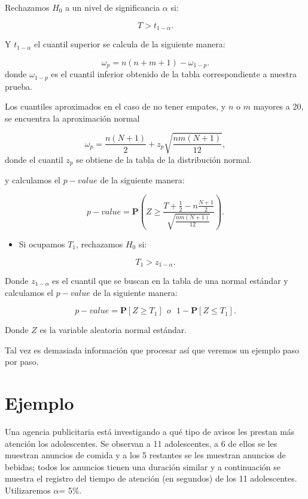 \documentclass[
  a4paper,
  oneside,
  openany]{book}
\providecommand{\tightlist}{%
  \setlength{\itemsep}{0pt}\setlength{\parskip}{0pt}}
\begin{document}
Rechazamos \(H_0\) a un nivel de significancia \(\alpha\) si:

\[T > t_{1-{\alpha}}.\]

Y \(t_{1-\alpha}\) el cuantil superior se calcula de la siguiente manera:

\[\omega_p= n(n+m+1)-\omega_{1-p}.\]
donde \(\omega_{1-p}\) es el cuantil inferior obtenido de la tabla correspondiente a nuestra prueba.

Los cuantiles aproximados en el caso de no tener empates, y \(n\) o \(m\) mayores a 20, se encuentra la aproximación normal

\[ \omega_p= \frac{n(N+1)}{2} + z_p\sqrt{\frac{n m(N+1)}{12}},\]
donde el cuantil \(z_p\) se obtiene de la tabla de la distribución normal.

y calculamos el \(p-value\) de la siguiente manera:

\[p-value = \mathbf{P}\left(Z\geq\frac{T+\frac{1}{2}-n\frac{N+1}{2}}{\sqrt{\frac{nm(N+1)}{12}}}\right).\]

\begin{itemize}
\tightlist
\item
  Si ocupamos \(T_{1}\), rechazamos \(H_0\) si:
\end{itemize}

\[T_{1} > z_{1-\alpha}.\]

Donde \(z_{1-\alpha}\) es el cuantil que se buscan en la tabla de una normal estándar y calculamos el \(p-value\) de la siguiente manera:

\[p-value=\mathbf{P}[Z\geq T_{1}] \ \ o \ \  \ 1-\mathbf{P}[Z\leq T_{1}].\]

Donde \(Z\) es la variable aleatoria normal estándar.

Tal vez es demasiada información que procesar así que veremos un ejemplo paso por paso.

\hypertarget{ejemplo-5}{%
\section{Ejemplo}\label{ejemplo-5}}

Una agencia publicitaria está investigando a qué tipo de avisos les prestan más atención los adolescentes. Se observan a 11 adolescentes, a 6 de ellos se les muestran anuncios de comida y a los 5 restantes se les muestran anuncios de bebidas; todos los anuncios tienen una duración similar y a continuación se muestra el registro del tiempo de atención (en segundos) de los 11 adolescentes.
Utilizaremos \(\alpha\)= 5\%.
\end{document}
